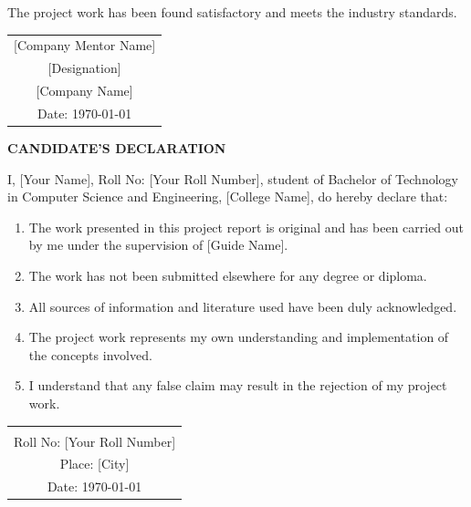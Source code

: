 \vspace{0.5cm}

The project work has been found satisfactory and meets the industry standards.

\vspace{2cm}

\begin{flushright}
\begin{tabular}{c}
\\[2cm]
\hline
{[Company Mentor Name]} \\
{[Designation]} \\
{[Company Name]} \\
Date: \today
\end{tabular}
\end{flushright}

\newpage
\thispagestyle{empty}

\begin{center}
{\fontsize{16}{19.2}\selectfont\bfseries CANDIDATE'S DECLARATION}
\end{center}

\vspace{1cm}

I, [Your Name], Roll No: [Your Roll Number], student of Bachelor of Technology in Computer Science and Engineering, [College Name], do hereby declare that:

\begin{enumerate}[leftmargin=2cm]
\item The work presented in this project report is original and has been carried out by me under the supervision of [Guide Name].

\item The work has not been submitted elsewhere for any degree or diploma.

\item All sources of information and literature used have been duly acknowledged.

\item The project work represents my own understanding and implementation of the concepts involved.

\item I understand that any false claim may result in the rejection of my project work.
\end{enumerate}

\vspace{2cm}

\begin{flushright}
\begin{tabular}{c}
\\[2cm]
\hline
[Your Name] \\
Roll No: [Your Roll Number] \\
Place: [City] \\
Date: \today
\end{tabular}
\end{flushright}
